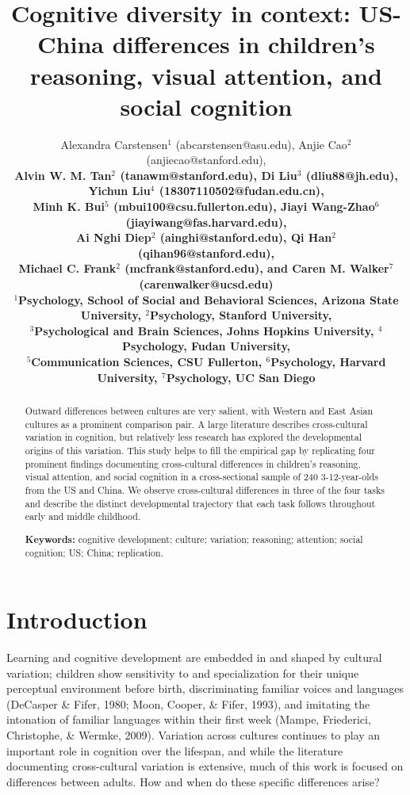 \documentclass[10pt, letterpaper]{article}
\title{Cognitive diversity in context: US-China differences in
children's reasoning, visual attention, and social cognition}
\author{Alexandra Carstensen$^{1}$ (abcarstensen@asu.edu), Anjie Cao$^{2}$  (anjiecao@stanford.edu), \\ \bf{Alvin W. M. Tan$^2$ (tanawm@stanford.edu)}, \bf{Di Liu$^3$ (dliu88@jh.edu)}, \bf{Yichun Liu$^4$ (18307110502@fudan.edu.cn)}, \\ \bf{Minh K. Bui$^5$ (mbui100@csu.fullerton.edu)}, \bf{Jiayi Wang-Zhao$^6$ (jiayiwang@fas.harvard.edu)}, \\ \bf{Ai Nghi Diep$^2$ (ainghi@stanford.edu)}, \bf{Qi Han$^2$ (qihan96@stanford.edu)}, \\ \bf{Michael C. Frank$^2$ (mcfrank@stanford.edu)}, and \bf{Caren M. Walker$^7$ (carenwalker@ucsd.edu)} \\ $^1$Psychology, School of Social and Behavioral Sciences, Arizona State University, $^2$Psychology, Stanford University, \\ $^3$Psychological and Brain Sciences, Johns Hopkins University,  $^4$Psychology, Fudan University, \\ $^5$Communication Sciences, CSU Fullerton,  $^6$Psychology, Harvard University,  $^7$Psychology, UC San Diego}
\begin{document}
\maketitle

\begin{abstract}
Outward differences between cultures are very salient, with Western and
East Asian cultures as a prominent comparison pair. A large literature
describes cross-cultural variation in cognition, but relatively less
research has explored the developmental origins of this variation. This
study helps to fill the empirical gap by replicating four prominent
findings documenting cross-cultural differences in children's reasoning,
visual attention, and social cognition in a cross-sectional sample of
240 3-12-year-olds from the US and China. We observe cross-cultural
differences in three of the four tasks and describe the distinct
developmental trajectory that each task follows throughout early and
middle childhood.

\textbf{Keywords:}
cognitive development; culture; variation; reasoning; attention; social
cognition; US; China; replication.
\end{abstract}

\hypertarget{introduction}{%
\section{Introduction}\label{introduction}}

Learning and cognitive development are embedded in and shaped by
cultural variation; children show sensitivity to and specialization for
their unique perceptual environment before birth, discriminating
familiar voices and languages (DeCasper \& Fifer, 1980; Moon, Cooper, \&
Fifer, 1993), and imitating the intonation of familiar languages within
their first week (Mampe, Friederici, Christophe, \& Wermke, 2009).
Variation across cultures continues to play an important role in
cognition over the lifespan, and while the literature documenting
cross-cultural variation is extensive, much of this work is focused on
differences between adults. How and when do these specific differences
arise?
\end{document}
